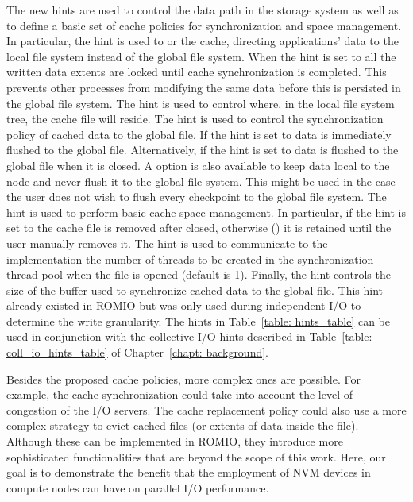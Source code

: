 The new hints are used to control the data path in the storage system as well as to define a basic set of cache policies for synchronization and space management. In particular, 
the  hint is used to  or  the cache, directing applications' data to the local file system instead of the global file system. 
When the hint is set to  all the written data extents are locked until cache synchronization is completed. This prevents other processes from modifying the same
data before this is persisted in the global file system. The  hint is used to control where, in the local file system tree, the cache file will reside. 
The  hint is used to control the synchronization policy of cached data to the global file. If the hint is set to  data 
is immediately flushed to the global file. Alternatively, if the hint is set to  data is flushed to the global file when it is closed. A  
option is also available to keep data local to the node and never flush it to the global file system. This might be used in the case the user does not wish to flush every checkpoint to the
global file system. The  hint is used to perform basic cache space management. In particular, if the hint is set to  the cache file 
is removed after closed, otherwise () it is retained until the user manually removes it. The  hint is used to communicate to the implementation 
the number of threads to be created in the synchronization thread pool when the file is opened (default is 1). Finally, the  hint controls the size of the 
buffer used to synchronize cached data to the global file. This hint already existed in ROMIO but was only used during independent I/O to determine the write granularity. The hints in 
Table~\ref{table: hints_table} can be used in conjunction with the collective I/O hints described in Table~\ref{table: coll_io_hints_table} of Chapter~\ref{chapt: background}.

Besides the proposed cache policies, more complex ones are possible. For example, the cache synchronization could take into account the level of congestion of the I/O servers. The cache 
replacement policy could also use a more complex strategy to evict cached files (or extents of data inside the file). Although these can be implemented in ROMIO, they introduce more 
sophisticated functionalities that are beyond the scope of this work. Here, our goal is to demonstrate the benefit that the employment of NVM devices in compute nodes can have on parallel
I/O performance.

